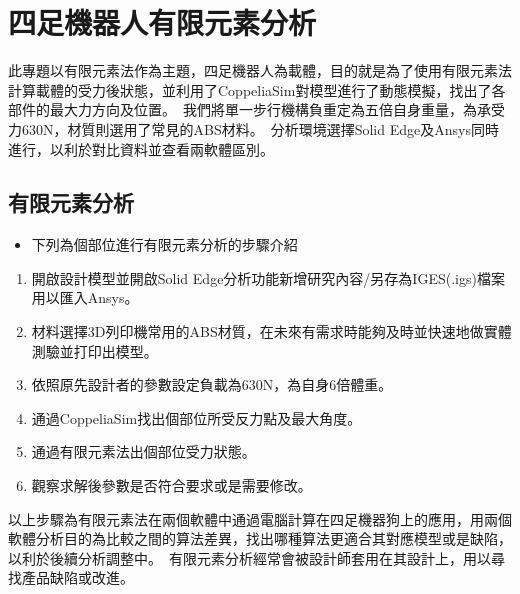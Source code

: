 \chapter{四足機器人有限元素分析}

此專題以有限元素法作為主題，四足機器人為載體，目的就是為了使用有限元素法計算載體的受力後狀態，並利用了CoppeliaSim對模型進行了動態模擬，找出了各部件的最大力方向及位置。\
我們將單一步行機構負重定為五倍自身重量，為承受力630N，材質則選用了常見的ABS材料。\
分析環境選擇Solid Edge及Ansys同時進行，以利於對比資料並查看兩軟體區別。\\

\section{有限元素分析}
\begin{itemize}
\item 下列為個部位進行有限元素分析的步驟介紹
\end{itemize}
\begin{enumerate}
\item 開啟設計模型並開啟Solid Edge分析功能新增研究內容/另存為IGES(.igs)檔案用以匯入Ansys。
\item 材料選擇3D列印機常用的ABS材質，在未來有需求時能夠及時並快速地做實體測驗並打印出模型。
\item 依照原先設計者的參數設定負載為630N，為自身6倍體重。
\item 通過CoppeliaSim找出個部位所受反力點及最大角度。
\item 通過有限元素法出個部位受力狀態。
\item 觀察求解後參數是否符合要求或是需要修改。
\end{enumerate}
以上步驟為有限元素法在兩個軟體中通過電腦計算在四足機器狗上的應用，用兩個軟體分析目的為比較之間的算法差異，找出哪種算法更適合其對應模型或是缺陷，以利於後續分析調整中。\
有限元素分析經常會被設計師套用在其設計上，用以尋找產品缺陷或改進。\
\newpage
